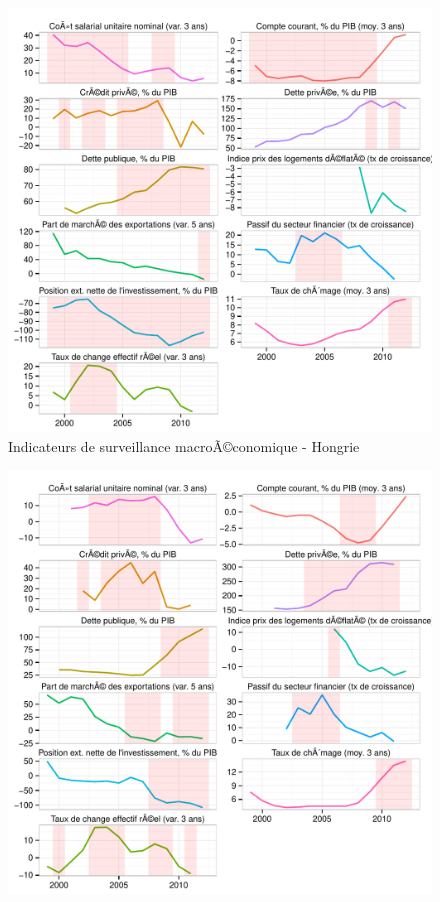 \documentclass{article}\usepackage[]{graphicx}\usepackage[]{color}
\makeatletter
\def\maxwidth{ %
  \ifdim\Gin@nat@width>\linewidth
    \linewidth
  \else
    \Gin@nat@width
  \fi
}
\newenvironment{knitrout}{}{} %
\makeatother
\begin{document}
\begin{knitrout}
\begin{figure}[p]
{\centering \includegraphics[width=\maxwidth]{figure_graph/byco14} 

}

\caption[Indicateurs de surveillance macroÃ©conomique - Hongrie]{Indicateurs de surveillance macroÃ©conomique - Hongrie\label{fig:byco14}}
\end{figure}

\begin{figure}[p]


{\centering \includegraphics[width=\maxwidth]{figure_graph/byco15} 

}
\end{figure}
\end{knitrout}
\end{document}
